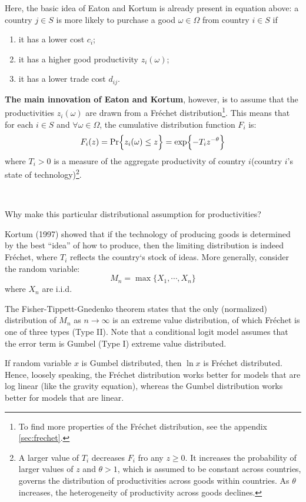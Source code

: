 Here, the basic idea of Eaton and Kortum is already present in equation above:
a country $j \in S$ is more likely to purchase a good $\omega \in \Omega$ from country $i \in S$ if
\begin{enumerate}
    \item[(1)] it has a lower cost $c_i$;
    \item[(2)] it has a higher good productivity $z_i(\omega)$;
    \item[(3)] it has a lower trade cost $d_{ij}$. 
\end{enumerate}

\textbf{The main innovation of Eaton and Kortum}, however, is to assume that the productivities $z_i(\omega)$ are drawn from a Fréchet distribution\footnote{To find more properties of the Fréchet distribution, see the appendix \ref{sec:frechet}.}.
This means that for each $i \in S$ and $\forall \omega \in \Omega$, the cumulative distribution function $F_i$ is:
\[
F_i(z) = \operatorname{Pr}\Bigl\{z_i(\omega) \leq z \Bigr\} = \exp \Bigl\{-T_i z^{-\theta} \Bigr\}
\]
where $T_i > 0$ is a measure of the aggregate productivity of country $i$(country $i$'s state of technology)\footnote{A larger value of $T_i$ decreases $F_i$ fro any $z\geq 0$. It increases the probability of larger values
of $z$ and $\theta>1$, which is assumed to be constant across countries, governs the distribution of productivities across goods within countries. As $\theta$ increases, the heterogeneity of productivity across goods declines.}.

\begin{note}
    \

    Why make this particular distributional assumption for productivities?

    Kortum (1997)\cite{kortum1997research} showed that if the technology of producing goods is determined by
    the best ``idea'' of how to produce, then the limiting distribution is indeed Fréchet, where
    $T_i$ reflects the country`s stock of ideas. More generally, consider the random variable:
    \[
    M_n = \max \{X_1, \cdots, X_n \}
    \]
    where $X_n$ are i.i.d.

    The Fisher-Tippett-Gnedenko theorem states that the only (normalized) distribution of
    $M_n$ as $n \to \infty $ is an extreme value distribution, of which Fréchet is one of three types (Type II).
    Note that a conditional logit model assumes that the error term is Gumbel (Type I) extreme value distributed.

    If random variable $x$ is Gumbel distributed, then $\ln{x}$ is Fréchet distributed. Hence, loosely speaking,
    the Fréchet distribution works better for models that are log linear (like the gravity equation), whereas the Gumbel
    distribution works better for models that are linear.
\end{note}

